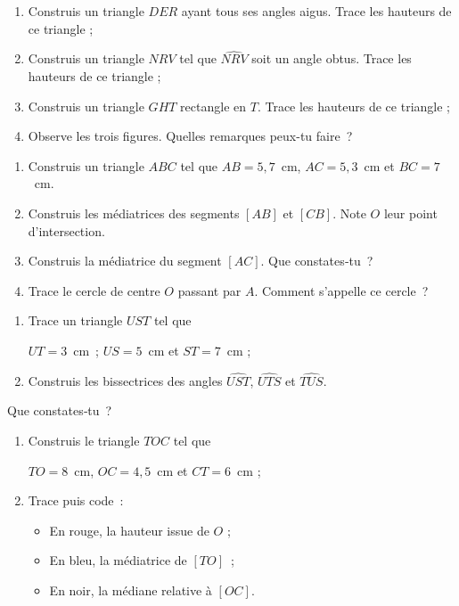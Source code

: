\begin{exercice}
\begin{enumerate}
 \item Construis un triangle $DER$ ayant tous ses angles aigus. Trace les hauteurs de ce triangle ;
 \item Construis un triangle $NRV$ tel que $\widehat{NRV}$ soit un angle obtus. Trace les hauteurs de ce triangle ;
 \item Construis un triangle $GHT$ rectangle en $T$. Trace les hauteurs de ce triangle ;
 \item Observe les trois figures. Quelles remarques peux-tu faire ?
 \end{enumerate}
\end{exercice}


\begin{exercice}
\begin{enumerate}
 \item Construis un triangle $ABC$ tel que $AB = 5,7$ cm, $AC = 5,3$ cm et $BC = 7$ cm.
 \item Construis les médiatrices des segments $[AB]$ et $[CB]$. Note $O$ leur point d'intersection.
 \item Construis la médiatrice du segment $[AC]$. Que constates‑tu ?
 \item Trace le cercle de centre $O$ passant par $A$. Comment s'appelle ce cercle ?
 \end{enumerate}
\end{exercice}


\begin{exercice}
\begin{enumerate}
 \item Trace un triangle $UST$ tel que 
 
 $UT = 3$ cm ; $US = 5$ cm et $ST = 7$ cm ;
 \item Construis les bissectrices des angles $\widehat{UST}$, $\widehat{UTS}$ et $\widehat{TUS}$.
 \end{enumerate}
 \vspace{-0.3cm}
Que constates‑tu ?
\end{exercice}


\begin{exercice}
\begin{enumerate}
 \item Construis le triangle $TOC$ tel que 
 
 $TO = 8$ cm, $OC = 4,5$ cm et $CT = 6$ cm ;
 \item Trace puis code :
  \begin{itemize}
   \item En rouge, la hauteur issue de $O$ ;
   \item En bleu, la médiatrice de $[TO]$ ;
   \item En noir, la médiane relative à $[OC]$.
   \end{itemize} 
 \end{enumerate}
\end{exercice}


